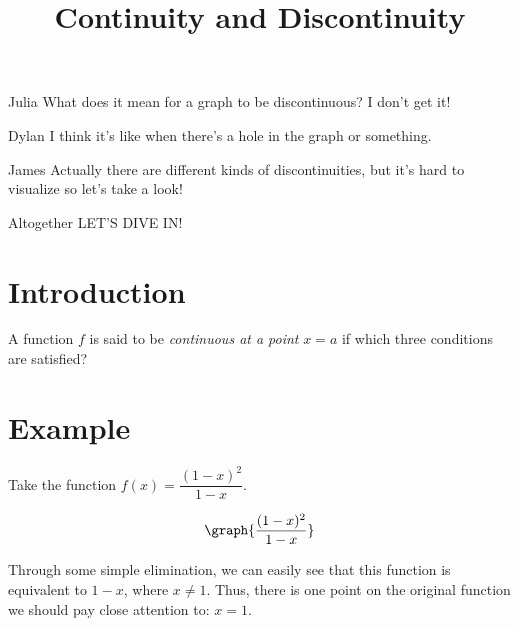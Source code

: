 \documentclass{ximera}
\title{Continuity and Discontinuity}
\begin{document}
\maketitle
\begin{dialogue}
\item[Julia]What does it mean for a graph to be discontinuous? I don't get it!
\item[Dylan] I think it's like when there's a hole in the graph or something.
\item[James] Actually there are different kinds of discontinuities, but it's hard to visualize so let's take a look!
\item[Altogether] LET'S DIVE IN!
\end{dialogue}
\section{Introduction}
\begin{question}
A function $f$ is said to be \textit{continuous at a point} $x = a$ if which three conditions are satisfied?
\begin{selectAll}
\end{selectAll}
\end{question}
\section{Example}
Take the function $f(x) = \dfrac{(1-x)^2}{1-x}$.

\[
\graph{\frac{(1-x)^2}{1-x}}
\]

Through some simple elimination, we can easily see that this function is equivalent to $1-x$, where $x \neq 1$. Thus, there is one point on the original function we should pay close attention to: $x=1$. 
\end{document}
